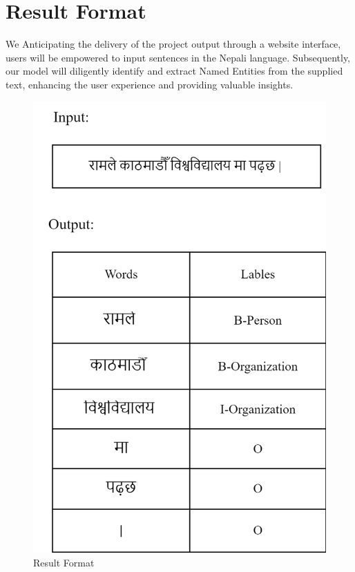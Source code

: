  
\newpage
\section{Result Format}
\vspace{10pt}

We Anticipating the delivery of the project output through a website interface, users will be empowered to input sentences in the Nepali language. Subsequently, our model will diligently identify and extract Named Entities from the supplied text, enhancing the user experience and providing valuable insights.

\begin{figure}[H]
\centering
\includegraphics [scale=1.6]{img/result & analysis/_Input_output.png}
 \caption[Result Format]{Result Format}

\end{figure}



